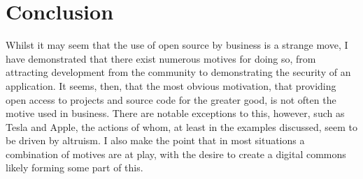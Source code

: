 \documentclass[a4paper]{article}
\begin{document}
\section{Conclusion}

Whilst it may seem that the use of open source by business is a strange move, I have demonstrated that there exist numerous motives for doing so, from attracting development from the community to demonstrating the security of an application. It seems, then, that the most obvious motivation, that providing open access to projects and source code for the greater good, is not often the motive used in business. There are notable exceptions to this, however, such as Tesla and Apple, the actions of whom, at least in the examples discussed, seem to be driven by altruism. I also make the point that in most situations a combination of motives are at play, with the desire to create a digital commons likely forming some part of this.


\end{document}
